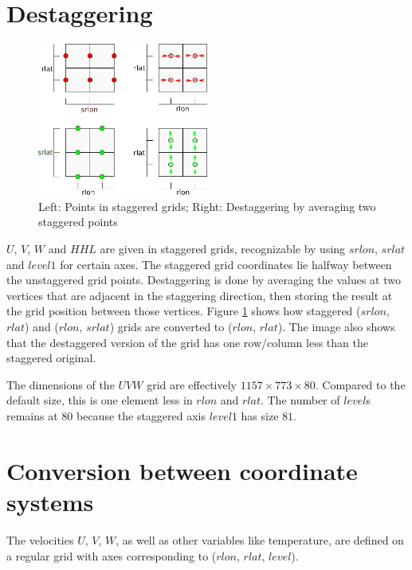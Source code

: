 \section{Destaggering}\label{sec:destaggering}
\begin{figure}
\centering \includegraphics*[width=0.5\textwidth]{figures/0613_staggering}
\caption{Left: Points in staggered grids; Right: Destaggering by averaging two staggered points}
\label{fig:destaggering}
\end{figure}
$U$, $V$, $W$ and $HHL$ are given in staggered grids, recognizable by using $srlon$, $srlat$ and $level1$ for certain axes. The staggered grid coordinates lie halfway between the unstaggered grid points. Destaggering is done by averaging the values at two vertices that are adjacent in the staggering direction, then storing the result at the grid position between those vertices. Figure \ref{fig:destaggering} shows how staggered ($srlon$, $rlat$) and ($rlon$, $srlat$) grids are converted to ($rlon$, $rlat$). The image also shows that the destaggered version of the grid has one row/column less than the staggered original.

The dimensions of the $UVW$ grid are effectively $1157 \times 773 \times 80$. Compared to the default size, this is one element less in $rlon$ and $rlat$. The number of $level$s remains at $80$ because the staggered axis $level1$ has size $81$.%

\section{Conversion between coordinate systems}\label{sec:conversion}
The velocities $U$, $V$, $W$, as well as other variables like temperature, are defined on a regular grid with axes corresponding to ($rlon$, $rlat$, $level$).

